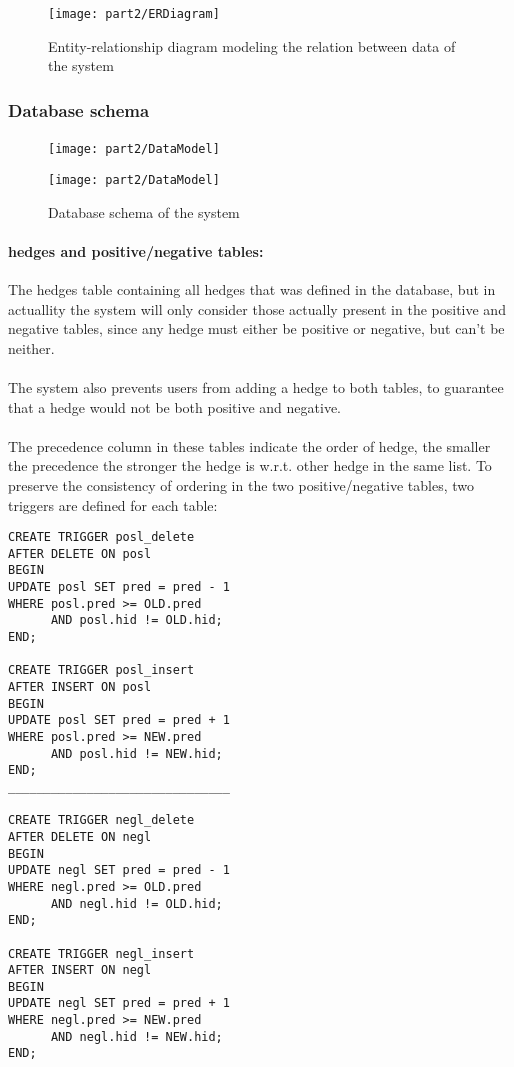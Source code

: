 \documentclass[../gr-final.tex]{subfiles}
\begin{document}
\begin{figure}[H]
\texttt{[image: part2/ERDiagram]}
\caption{Entity-relationship diagram modeling the relation
between data of the system}
\end{figure}
\subsubsection{Database schema}
\paragraph{}

\begin{figure}[H]
\texttt{[image: part2/DataModel]}
\end{figure}
\begin{figure}[H]
\texttt{[image: part2/DataModel]}
\caption{Database schema of the system}
\end{figure}

\paragraph{hedges and positive/negative tables:}
The hedges table containing all hedges that was defined in the database, but
in actuallity the system will only consider those actually present in
the positive and negative tables, since any hedge must either be
positive or negative, but can't be neither.
\paragraph{} The system also prevents users from adding a hedge to both tables, to
guarantee that a hedge would not be both positive and negative.
\paragraph{} The precedence column in these tables indicate the order of hedge, the
smaller the precedence the stronger the hedge is w.r.t. other hedge in
the same list. To preserve the consistency of ordering in the two
positive/negative tables, two triggers are defined for each
table:\\
\begin{lstlisting}
CREATE TRIGGER posl_delete  
AFTER DELETE ON posl  
BEGIN
UPDATE posl SET pred = pred - 1          
WHERE posl.pred >= OLD.pred 
      AND posl.hid != OLD.hid;
END;

CREATE TRIGGER posl_insert   
AFTER INSERT ON posl   
BEGIN
UPDATE posl SET pred = pred + 1
WHERE posl.pred >= NEW.pred 
      AND posl.hid != NEW.hid;  
END;
_______________________________

CREATE TRIGGER negl_delete  
AFTER DELETE ON negl  
BEGIN
UPDATE negl SET pred = pred - 1
WHERE negl.pred >= OLD.pred 
      AND negl.hid != OLD.hid;  
END;

CREATE TRIGGER negl_insert   
AFTER INSERT ON negl   
BEGIN
UPDATE negl SET pred = pred + 1        
WHERE negl.pred >= NEW.pred 
      AND negl.hid != NEW.hid;  
END;
\end{lstlisting}
\end{document}
